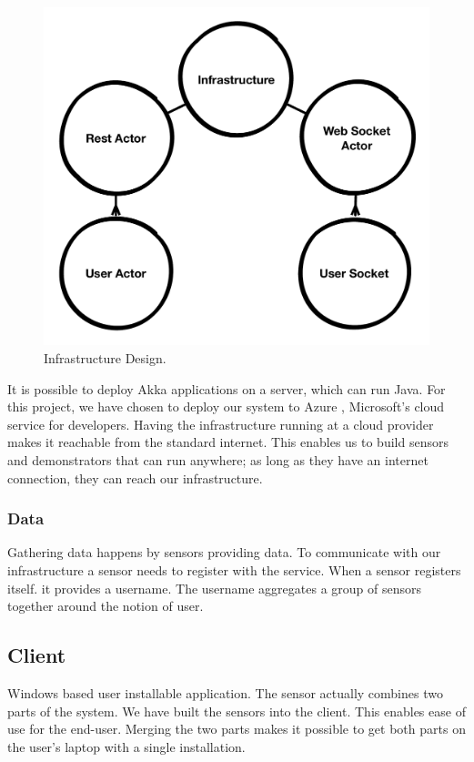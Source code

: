 \documentclass{sigchi}
\begin{document}
\begin{figure}[H]
  \centering
  \includegraphics[width=\columnwidth]{figures/infrastructure_design.pdf}
  \caption{Infrastructure Design.}
  \label{fig:infrastructure}
\end{figure}

It is possible to deploy Akka applications on a server, which can run Java.
For this project, we have chosen to deploy our system to Azure \cite{azure}, Microsoft's cloud service for developers.
Having the infrastructure running at a cloud provider makes it reachable from the standard internet.
This enables us to build sensors and demonstrators that can run anywhere; as long as they have an internet connection, they can reach our infrastructure.

\subsubsection{Data}
Gathering data happens by sensors providing data.
To communicate with our infrastructure a sensor needs to register with the service.
When a sensor registers itself. it provides a username.
The username aggregates a group of sensors together around the notion of user.

\subsection{Client}
Windows based user installable application.
The sensor actually combines two parts of the system.
We have built the sensors into the client.
This enables ease of use for the end-user.
Merging the two parts makes it possible to get both parts on the user's laptop with a single installation.
\end{document}
